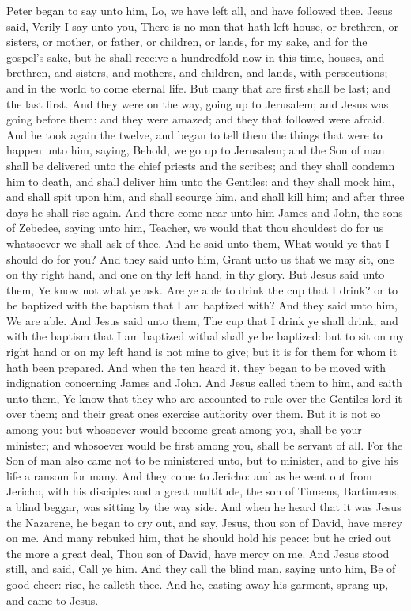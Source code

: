 Peter began to say unto him, Lo, we have left all, and have followed thee. Jesus said, Verily I say unto you, There is no man that hath left house, or brethren, or sisters, or mother, or father, or children, or lands, for my sake, and for the gospel’s sake, but he shall receive a hundredfold now in this time, houses, and brethren, and sisters, and mothers, and children, and lands, with persecutions; and in the world to come eternal life. But many that are first shall be last; and the last first.  And they were on the way, going up to Jerusalem; and Jesus was going before them: and they were amazed; and they that followed were afraid. And he took again the twelve, and began to tell them the things that were to happen unto him, saying, Behold, we go up to Jerusalem; and the Son of man shall be delivered unto the chief priests and the scribes; and they shall condemn him to death, and shall deliver him unto the Gentiles: and they shall mock him, and shall spit upon him, and shall scourge him, and shall kill him; and after three days he shall rise again.  And there come near unto him James and John, the sons of Zebedee, saying unto him, Teacher, we would that thou shouldest do for us whatsoever we shall ask of thee. And he said unto them, What would ye that I should do for you? And they said unto him, Grant unto us that we may sit, one on thy right hand, and one on thy left hand, in thy glory. But Jesus said unto them, Ye know not what ye ask. Are ye able to drink the cup that I drink? or to be baptized with the baptism that I am baptized with? And they said unto him, We are able. And Jesus said unto them, The cup that I drink ye shall drink; and with the baptism that I am baptized withal shall ye be baptized: but to sit on my right hand or on my left hand is not mine to give; but it is for them for whom it hath been prepared. And when the ten heard it, they began to be moved with indignation concerning James and John. And Jesus called them to him, and saith unto them, Ye know that they who are accounted to rule over the Gentiles lord it over them; and their great ones exercise authority over them. But it is not so among you: but whosoever would become great among you, shall be your minister; and whosoever would be first among you, shall be servant of all. For the Son of man also came not to be ministered unto, but to minister, and to give his life a ransom for many.  And they come to Jericho: and as he went out from Jericho, with his disciples and a great multitude, the son of Timæus, Bartimæus, a blind beggar, was sitting by the way side. And when he heard that it was Jesus the Nazarene, he began to cry out, and say, Jesus, thou son of David, have mercy on me. And many rebuked him, that he should hold his peace: but he cried out the more a great deal, Thou son of David, have mercy on me. And Jesus stood still, and said, Call ye him. And they call the blind man, saying unto him, Be of good cheer: rise, he calleth thee. And he, casting away his garment, sprang up, and came to Jesus. 